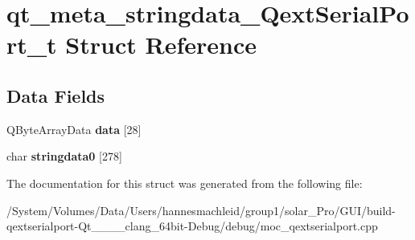 \hypertarget{structqt__meta__stringdata___qext_serial_port__t}{}\section{qt\+\_\+meta\+\_\+stringdata\+\_\+\+Qext\+Serial\+Port\+\_\+t Struct Reference}
\label{structqt__meta__stringdata___qext_serial_port__t}
\subsection*{Data Fields}
\begin{DoxyCompactItemize}
\item 
\mbox{\label{structqt__meta__stringdata___qext_serial_port__t_af2f7dce857459f71e5e86a6ceb555f52}} 
Q\+Byte\+Array\+Data {\bfseries data} \mbox{[}28\mbox{]}
\item 
\mbox{\label{structqt__meta__stringdata___qext_serial_port__t_abbbdeef2d72f98b76d056287a1a2f562}} 
char {\bfseries stringdata0} \mbox{[}278\mbox{]}
\end{DoxyCompactItemize}


The documentation for this struct was generated from the following file\+:\begin{DoxyCompactItemize}
\item 
/\+System/\+Volumes/\+Data/\+Users/hannesmachleid/group1/solar\+\_\+\+Pro/\+G\+U\+I/build-\/qextserialport-\/\+Qt\+\_\+\_\+\_\+\_\+clang\+\_\+64bit-\/\+Debug/debug/moc\+\_\+qextserialport.\+cpp\end{DoxyCompactItemize}

